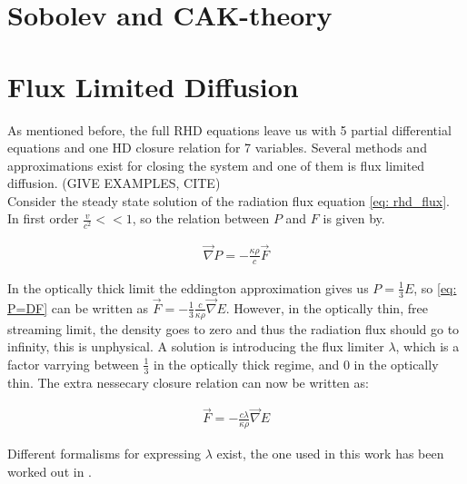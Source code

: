 \section{Sobolev and CAK-theory}


\section{Flux Limited Diffusion} \label{section: introduction Flux Limited Diffusion}
As mentioned before, the full RHD equations leave us with 5 partial differential equations and one HD closure relation for 7 variables. Several methods and approximations exist for closing the system and one of them is flux limited diffusion. (GIVE EXAMPLES, CITE)\\

Consider the steady state solution of the radiation flux equation \eqref{eq: rhd_flux}. In first order $\frac{v}{c^2} << 1$, so the relation between $P$ and $F$ is given by.

\begin{align}
\vec{\nabla} P = - \frac{\kappa \rho}{c} \vec{F} \label{eq: P=DF}
\end{align}

In the optically thick limit the eddington approximation gives us $P = \frac{1}{3}E$, so \eqref{eq: P=DF} can be written as $\vec{F} = -\frac{1}{3}\frac{c}{\kappa \rho} \vec{\nabla}E$. However, in the optically thin, free streaming limit, the density goes to zero and thus the radiation flux should go to infinity, this is unphysical. A solution is introducing the flux limiter $\lambda$, which is a factor varrying between $\frac{1}{3}$ in the optically thick regime, and $0$ in the optically thin. The extra nessecary closure relation can now be written as:

\begin{align}
\vec{F} = -\frac{c\lambda}{\kappa \rho} \vec{\nabla}E \label{eq: fld_closing}
\end{align}

Different formalisms for expressing $\lambda$ exist, the one used in this work has been worked out in \cite{Levermore1981}.